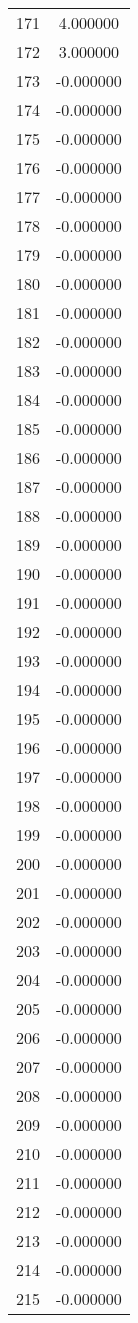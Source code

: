 \documentclass[12pt]{article}
\begin{document}
\begin{longtable}{@{}cc@{}}
171 & 4.000000 \\
172 & 3.000000 \\
173 & -0.000000 \\
174 & -0.000000 \\
175 & -0.000000 \\
176 & -0.000000 \\
177 & -0.000000 \\
178 & -0.000000 \\
179 & -0.000000 \\
180 & -0.000000 \\
181 & -0.000000 \\
182 & -0.000000 \\
183 & -0.000000 \\
184 & -0.000000 \\
185 & -0.000000 \\
186 & -0.000000 \\
187 & -0.000000 \\
188 & -0.000000 \\
189 & -0.000000 \\
190 & -0.000000 \\
191 & -0.000000 \\
192 & -0.000000 \\
193 & -0.000000 \\
194 & -0.000000 \\
195 & -0.000000 \\
196 & -0.000000 \\
197 & -0.000000 \\
198 & -0.000000 \\
199 & -0.000000 \\
200 & -0.000000 \\
201 & -0.000000 \\
202 & -0.000000 \\
203 & -0.000000 \\
204 & -0.000000 \\
205 & -0.000000 \\
206 & -0.000000 \\
207 & -0.000000 \\
208 & -0.000000 \\
209 & -0.000000 \\
210 & -0.000000 \\
211 & -0.000000 \\
212 & -0.000000 \\
213 & -0.000000 \\
214 & -0.000000 \\
215 & -0.000000 \\

\end{longtable}
\end{document}

